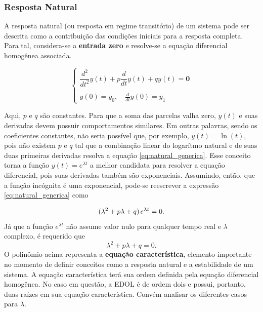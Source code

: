 \documentclass{article}
\numberwithin{equation}{section}
\let\dfr\dfrac
\begin{document}
\subsubsection{Resposta Natural}
\label{subsubsec:natural}
A resposta natural (ou resposta em regime transitório) de um sistema pode ser descrita como a contribuição das condições iniciais para a resposta completa. Para tal, considera-se a \textbf{entrada zero} e resolve-se a equação diferencial homogênea associada.

\begin{equation}
    \begin{cases}
        \dfr{d^2}{dt^2}y(t)+p\dfr{d}{dt}y(t)+qy(t)=\textbf{0}\\ \\
        \displaystyle{y(0)=y_{0}, \quad \frac{d}{dt}y(0)=y_{1}}
    \end{cases} \label{eq:natural_generica}
\end{equation}

\noindent Aqui, $p$ e $q$ são constantes. Para que a soma das parcelas valha zero, $y(t)$ e suas derivadas devem possuir comportamentos similares. Em outras palavras, sendo os coeficientes constantes, não seria possível que, por exemplo, $y(t)=\ln(t)$, pois não existem $p$ e $q$ tal que a combinação linear do logarítmo natural e de suas duas primeiras derivadas resolva a equação \eqref{eq:natural_generica}. Esse conceito torna a função $y(t) = e^{\lambda t}$ a melhor candidata para resolver a equação diferencial, pois suas derivadas também são exponenciais. Assumindo, então, que a função incógnita é uma exponencial, pode-se reescrever a expressão \eqref{eq:natural_generica} como

\begin{equation*}
    (\lambda^{2}+p\lambda+q)\hspace{0.05cm} e^{\lambda t} = 0.
\end{equation*}
Já que a função $e^{\lambda t}$ não assume valor nulo para qualquer tempo real e $\lambda$ complexo, é requerido que
\begin{equation}
    \lambda^{2}+p\lambda+q=0.
\end{equation}
O polinômio acima representa a \textbf{equação característica}, elemento importante no momento de definir conceitos como a resposta natural e a estabilidade de um sistema. A equação característica terá sua ordem definida pela equação diferencial homogênea. No caso em questão, a EDOL é de ordem dois e possui, portanto, duas raízes em sua equação característica. Convém analisar os diferentes casos para $\lambda$.
\end{document}
